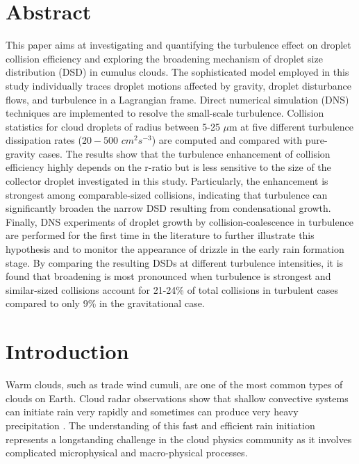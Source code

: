 \section*{\centering Abstract}
This paper aims at investigating and quantifying the turbulence effect on droplet collision efficiency and exploring the broadening mechanism of droplet size distribution (DSD) in cumulus clouds. The sophisticated model employed in this study individually traces droplet motions affected by gravity, droplet disturbance flows, and turbulence in a Lagrangian frame. Direct numerical simulation (DNS) techniques are implemented to resolve the small-scale turbulence. Collision statistics for cloud droplets of radius between 5-25 $\mu$m at five different turbulence dissipation rates ($20-500 $ $cm^2s^{-3}$) are computed and compared with pure-gravity cases. The results show that the turbulence enhancement of collision efficiency highly depends on the r-ratio but is less sensitive to the size of the collector droplet investigated in this study. Particularly, the enhancement is strongest among comparable-sized collisions, indicating that turbulence can significantly broaden the narrow DSD resulting from condensational growth. Finally, DNS experiments of droplet growth by collision-coalescence in turbulence are performed for the first time in the literature to further illustrate this hypothesis and to monitor the appearance of drizzle in the early rain formation stage. By comparing the resulting DSDs at different turbulence intensities, it is found that broadening is most pronounced when turbulence is strongest and similar-sized collisions account for 21-24\% of total collisions in turbulent cases compared to only 9\% in the gravitational case.

\section{Introduction}\label{sec:ch3_intro}

Warm clouds, such as trade wind cumuli, are one of the most common types of clouds on Earth. Cloud radar observations show that shallow convective systems can initiate rain very rapidly and sometimes can produce very heavy precipitation \citep{Stevens2016}. The understanding of this fast and efficient rain initiation represents a longstanding challenge in the cloud physics community as it involves complicated microphysical and macro-physical processes. 

